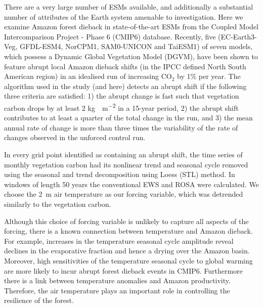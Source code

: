 There are a very large number of ESMs available, and additionally a substantial number of attributes of the Earth system amenable to investigation. Here we 
examine Amazon forest dieback in state-of-the-art ESMs from the Coupled Model Intercomparison  Project - Phase 6 (CMIP6)\cite{Eyring2016} database. Recently,
five (EC-Earth3-Veg, GFDL-ESM4, NorCPM1, SAM0-UNICON and TaiESM1) of seven models, which possess a Dynamic Global Vegetation Model
(DGVM), have been shown to feature abrupt local Amazon dieback shifts (in the IPCC defined North South American region) in an idealised run of increasing CO$_2$ by 1\% per year\cite{Parry2022}.
The algorithm used in the study (and here) detects an abrupt shift if the following three criteria are satisfied: 1) the abrupt change is fast such that vegetation carbon drops by at least 2 \si{\kilogram\carbon\per\meter\squared} in a 15-year period, 2) the abrupt shift contributes to at least a quarter of the total change in the run, and 3) the mean annual rate of change is more than three times the variability of the rate of changes observed in the unforced control run. 

In every grid point identified as containing an abrupt shift, the time series of monthly vegetation carbon had its nonlinear trend and seasonal cycle removed
using the seasonal and trend decomposition using
Loess (STL) method\cite{Cleaveland1990}. In 
windows of length 50 years the conventional EWS and ROSA were calculated.
We choose the \si{2\meter} air temperature as our forcing variable, which
was detrended similarly to the vegetation carbon. 

Although this choice of forcing variable is unlikely to capture all aspects
of the forcing, there is a known connection between temperature and Amazon 
dieback. For example, increases in the temperature seasonal cycle amplitude reveal declines in the evaporative fraction and hence a drying over the Amazon basin\cite{Ritchie2022}. Moreover, high sensitivities of the temperature seasonal cycle to global warming are more likely to incur abrupt forest dieback events\cite{Parry2022} in CMIP6. Furthermore there is a link between temperature anomalies and Amazon productivity\cite{Boulton2013}. Therefore, the air temperature plays an important role in controlling the resilience of the forest.

